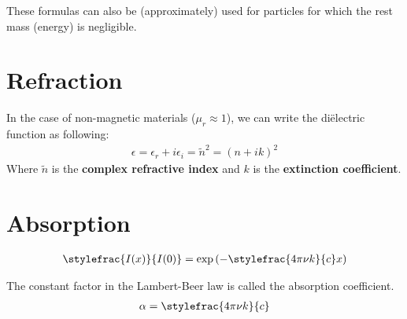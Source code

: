         \begin{remark*}
        	These formulas can also be (approximately) used for particles for which the rest mass (energy) is negligible.
        \end{remark*}

\section{Refraction}

	\begin{formula}
		In the case of non-magnetic materials ($\mu_r\approx1$), we can write the di\"electric function as following:
       		\begin{gather}
			\label{optics:dielectric_function_non_magnetic}
			\epsilon = \epsilon_r + i\epsilon_i = \widetilde{n}^2 = (n+ik)^2
		\end{gather}
		Where $\widetilde{n}$ is the \textbf{complex refractive index} and $k$ is the \textbf{extinction coefficient}.
	\end{formula}
    

\section{Absorption}

	\begin{theorem}\label{optics:lambert_beer}
        	\begin{gather}
		        \stylefrac{I(x)}{I(0)} = \text{exp}\left(-\stylefrac{4\pi\nu k}{c}x\right)
		\end{gather}
	\end{theorem}

	\begin{definition}
        	The constant factor in the Lambert-Beer law is called the absorption coefficient.
	        \begin{gather}
		        \label{optics:absorption_coefficient}
			\alpha = \stylefrac{4\pi\nu k}{c}
		\end{gather}
	\end{definition}